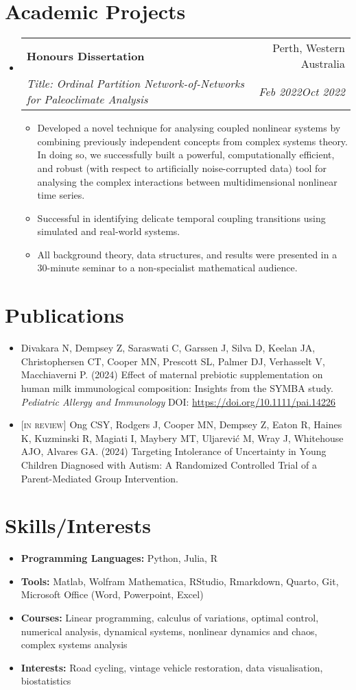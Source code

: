 \documentclass[letterpaper,10.8pt]{article}
\makeatletter
\newcommand{\resumeItem}[2]{
  \item\small{
    \textbf{#1}{#2 \vspace{-2pt}}
  }
}
\newcommand{\resumeSubheading}[4]{
  \vspace{-1pt}\item
    \begin{tabular*}{0.97\textwidth}{l@{\extracolsep{\fill}}r}
      \textbf{#1} & #2 \\
      \textit{\small#3} & \textit{\small #4} \\
    \end{tabular*}\vspace{-5pt}
}
\newcommand{\resumeSubItem}[2]{\resumeItem{#1}{#2}\vspace{-4pt}}
\newcommand{\resumeSubHeadingListStart}{\begin{itemize}[leftmargin=*]}
\newcommand{\resumeSubHeadingListEnd}{\end{itemize}}
\newcommand{\resumeItemListStart}{\begin{itemize}}
\newcommand{\resumeItemListEnd}{\end{itemize}\vspace{-5pt}}
\makeatother
\begin{document}
\section{Academic Projects}
\resumeSubHeadingListStart
\resumeSubheading
    {Honours Dissertation}{Perth, Western Australia}
    {Title: Ordinal Partition Network-of-Networks for Paleoclimate Analysis}{Feb 2022\textendash Oct 2022}
    \resumeItemListStart
    \resumeItem{}{Developed a novel technique for analysing coupled nonlinear systems by combining previously independent concepts from complex systems theory. In doing so, we successfully built a powerful, computationally efficient, and robust (with respect to artificially noise-corrupted data) tool for analysing the complex interactions between multidimensional nonlinear time series.}
    \resumeItem{}{Successful in identifying delicate temporal coupling transitions using simulated and real-world systems.}
    \resumeItem{}{All background theory, data structures, and results were presented in a 30-minute seminar to a non-specialist mathematical audience.}
    \resumeItemListEnd
\resumeSubHeadingListEnd

\section{Publications}
\begin{itemize}
    \item Divakara N, Dempsey Z, Saraswati C, Garssen J, Silva D, Keelan JA, Christophersen CT, Cooper MN, Prescott SL, Palmer DJ, Verhasselt V, Macchiaverni P. (2024) Effect of maternal prebiotic supplementation on human milk immunological composition: Insights from the SYMBA study. \textit{Pediatric Allergy and Immunology} DOI: \url{https://doi.org/10.1111/pai.14226}
    \item \textsc{[in review]} Ong CSY, Rodgers J, Cooper MN, Dempsey Z, Eaton R, Haines K, Kuzminski R, Magiati I, Maybery MT, Uljarević M, Wray J, Whitehouse AJO, Alvares GA. (2024) Targeting Intolerance of Uncertainty in Young Children Diagnosed with Autism: A Randomized Controlled Trial of a Parent-Mediated Group Intervention.
\end{itemize}

\section{Skills/Interests}
	\resumeSubHeadingListStart
	\resumeSubItem{Programming Languages: }{Python, Julia, R}
	\resumeSubItem{Tools: }{Matlab, Wolfram Mathematica, RStudio, Rmarkdown, Quarto, Git, Microsoft Office (Word, Powerpoint, Excel)}
	\resumeSubItem{Courses: }{Linear programming, calculus of variations, optimal control, numerical analysis, dynamical systems, nonlinear dynamics and chaos, complex systems analysis}
	\resumeSubItem{Interests: }{Road cycling, vintage vehicle restoration, data visualisation, biostatistics}
\resumeSubHeadingListEnd
\end{document}
